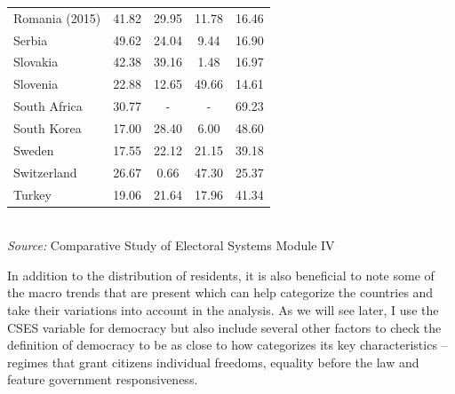 \documentclass[12pt, titlepage]{article}
\newcommand\e{\emph}
\newcommand\tb{\textbf}
\begin{document}
\begin{table}
\begin{tabulary}{\linewidth}{l c c c c}
		Romania (2015)&41.82&29.95&11.78&16.46 \\
		Serbia&49.62&24.04&9.44&16.90 \\
		Slovakia&42.38&39.16&1.48&16.97 \\
		Slovenia&22.88&12.65&49.66&14.61 \\
		South Africa&30.77&-&-&69.23 \\
		South Korea&17.00&28.40&6.00&48.60 \\
		Sweden&17.55&22.12&21.15&39.18 \\
		Switzerland&26.67&0.66&47.30&25.37 \\
		Turkey&19.06&21.64&17.96&41.34 \\
		\hline
	\end{tabulary} \\
\e{Source:} Comparative Study of Electoral Systems Module IV 
\label{table2}
\end{table}



In addition to the distribution of residents, it is also beneficial to note some of the macro trends that are present which can help categorize the countries and take their variations into account in the analysis. As we will see later, I use the CSES variable for democracy but also include several other factors to check the definition of democracy to be as close to how \cite{diamond2004overview} categorizes its key characteristics -- regimes that grant citizens individual freedoms, equality before the law and feature government responsiveness.
\end{document}
